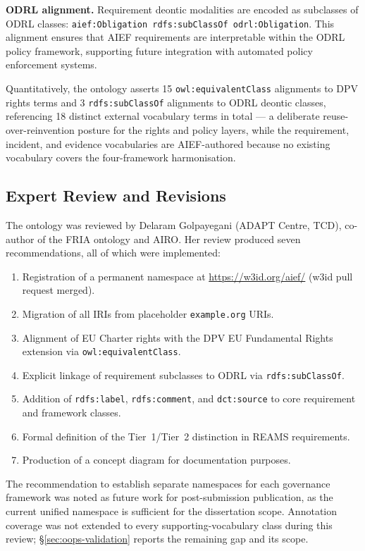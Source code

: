 \textbf{ODRL alignment.} Requirement deontic modalities are encoded as subclasses of ODRL classes: \texttt{aief:Obligation rdfs:subClassOf odrl:Obligation}. This alignment ensures that AIEF requirements are interpretable within the ODRL policy framework, supporting future integration with automated policy enforcement systems.

Quantitatively, the ontology asserts 15 \texttt{owl:equivalentClass} alignments to DPV rights terms and 3 \texttt{rdfs:subClassOf} alignments to ODRL deontic classes, referencing 18 distinct external vocabulary terms in total --- a deliberate reuse-over-reinvention posture for the rights and policy layers, while the requirement, incident, and evidence vocabularies are AIEF-authored because no existing vocabulary covers the four-framework harmonisation.


\subsection{Expert Review and Revisions}

The ontology was reviewed by Delaram Golpayegani (ADAPT Centre, TCD), co-author of the FRIA ontology and AIRO. Her review produced seven recommendations, all of which were implemented:

\begin{enumerate}
\item Registration of a permanent namespace at \url{https://w3id.org/aief/} (w3id pull request merged).
\item Migration of all IRIs from placeholder \texttt{example.org} URIs.
\item Alignment of EU Charter rights with the DPV EU Fundamental Rights extension via \texttt{owl:equivalentClass}.
\item Explicit linkage of requirement subclasses to ODRL via \texttt{rdfs:subClassOf}.
\item Addition of \texttt{rdfs:label}, \texttt{rdfs:comment}, and \texttt{dct:source} to core requirement and framework classes.
\item Formal definition of the Tier~1/Tier~2 distinction in REAMS requirements.
\item Production of a concept diagram for documentation purposes.
\end{enumerate}

The recommendation to establish separate namespaces for each governance framework was noted as future work for post-submission publication, as the current unified namespace is sufficient for the dissertation scope. Annotation coverage was not extended to every supporting-vocabulary class during this review; \S\ref{sec:oops-validation} reports the remaining gap and its scope.


